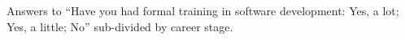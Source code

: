 \label{fig:train1}

Answers to ``Have you had formal training in software development: Yes, a lot; Yes, a little; No'' sub-divided by career stage.